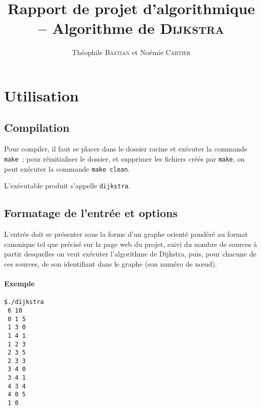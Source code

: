 \documentclass[12pt,a4paper]{article}
\author{Théophile \textsc{Bastian} et Noémie \textsc{Cartier}}
\title{Rapport de projet d'algorithmique -- Algorithme de \textsc{Dijkstra}}
\begin{document}
\maketitle

\section{Utilisation}

\subsection{Compilation}

Pour compiler, il faut se placer dans le dossier racine et exécuter la commande \texttt{make}~; pour réinitialiser le dossier, et supprimer les fichiers créés par \texttt{make}, on peut exécuter la commande \texttt{make clean}.

L'exécutable produit s'appelle \texttt{dijkstra}.

\subsection{Formatage de l'entrée et options}

L'entrée doit se présenter sous la forme d'un graphe orienté pondéré au format canonique tel que précisé sur la page web du projet, suivi du nombre de sources à partir desquelles on veut exécuter l'algorithme de Dijkstra, puis, pour chacune de ces sources, de son identifiant dans le graphe (son numéro de nœud).

\paragraph{Exemple}

\begin{lstlisting}
$./dijkstra
 6 10                                                                            
 0 1 5                                                                           
 1 3 0                                                                           
 1 4 1                                                                           
 1 2 3                                                                           
 2 3 5                                                                           
 2 3 3                                                                           
 3 4 0                                                                           
 3 4 1                                                                           
 4 3 4                                                                           
 4 0 5                                                                           
 1 0  
\end{lstlisting}
\end{document}
